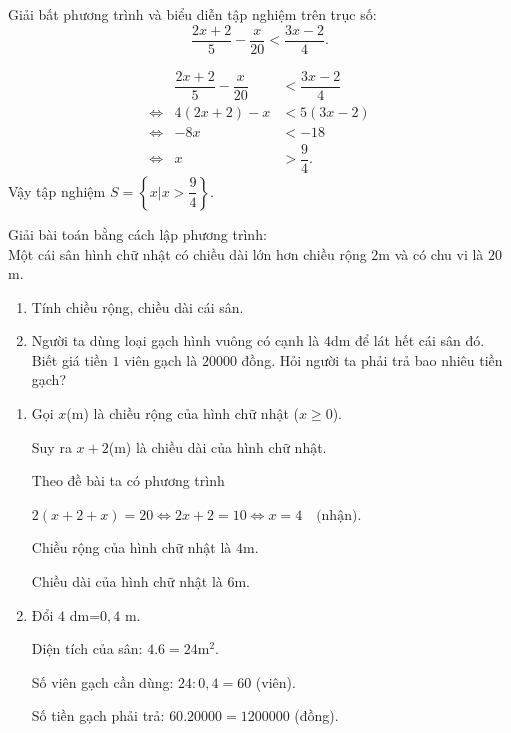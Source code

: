 \begin{ex}%
    Giải bất phương trình và biểu diễn tập nghiệm trên trục số:
    $$\dfrac{2x+2}{5} -\dfrac{x}{20} < \dfrac{3x-2}{4}.$$
\loigiai

    {\begin{eqnarray*}
    	&\dfrac{2x+2}{5} -\dfrac{x}{20} &< \dfrac{3x-2}{4}\\
    	\Leftrightarrow& 4(2x+2)-x&<5(3x-2)\\
    	\Leftrightarrow& -8x&<-18\\
    	\Leftrightarrow& x&>\dfrac{9}{4}.
    	\end{eqnarray*}
    Vậy tập nghiệm $S=\left\{x|x>\dfrac{9}{4}\right\}$.
    
\begin{center}
\end{center}
    }
\end{ex}

\begin{ex}%
    Giải bài toán bằng cách lập phương trình:\\
    Một cái sân hình chữ nhật có chiều dài lớn hơn chiều rộng $2$m và có chu vi là $20$m.
    \begin{enumerate}
    	\item Tính chiều rộng, chiều dài cái sân.
    	\item Người ta dùng loại gạch hình vuông có cạnh là $4$dm để lát hết cái sân đó. Biết giá tiền $1$ viên gạch là $20000$ đồng. Hỏi người ta phải trả bao nhiêu tiền gạch?
    \end{enumerate}
\loigiai
    {
    \begin{enumerate}
        \item Gọi $x$(m) là chiều rộng của hình chữ nhật ($x\ge0$).
        
        Suy ra $x+2$(m) là chiều dài của hình chữ nhật.
        
        Theo đề bài ta có phương trình
        
        $2(x+2+x)=20 \Leftrightarrow 2x+2=10 \Leftrightarrow x=4 \quad \text{(nhận)}$.
        
        Chiều rộng của hình chữ nhật là $4$m.
        
        Chiều dài của hình chữ nhật là $6$m.
        \item Đổi $4$ dm=$0,4$ m.
        
        Diện tích của sân: $4 . 6 =24 $m$^2$.
        
        Số viên gạch cần dùng: $24:0,4=60$ (viên).
        
        Số tiền gạch phải trả: $60 . 20000=1200000$ (đồng).
    \end{enumerate}
    }
\end{ex}

